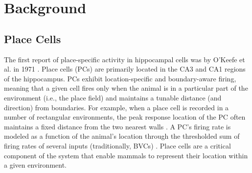 \documentclass[conference]{IEEEtran}
\begin{document}



\section{Background}
\label{sec:bio_background}
\subsection{Place Cells}
The first report of place-specific activity in hippocampal cells was by O'Keefe et al. in 1971 \cite{okeefe1971hippocampus}. Place cells (PCs) are primarily located in the CA3 and CA1 regions of the hippocampus. PCs exhibit location-specific and boundary-aware firing, meaning that a given cell fires only when the animal is in a particular part of the environment (i.e., the place field) and maintains a tunable distance (and direction) from boundaries. For example, when a place cell is recorded in a number of rectangular environments, the peak response location of the PC often maintains a fixed distance from the two nearest walls \cite{burgess1996neuronal}. A PC's firing rate is modeled as a function of the animal's location through the thresholded sum of firing rates of several inputs (traditionally, BVCs) \cite{hartley2000modeling}. Place cells are a critical component of the system that enable mammals to represent their location within a given environment.
\end{document}
